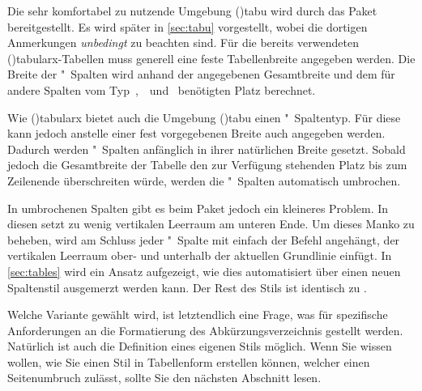 \documentclass[%
  english,ngerman,%
  cdgeometry=no,DIV=12,%
  cd=false,cdfont=false,cdtitle=true,%
  headings=normal,%
  automark,%
  listof=toc,%
]{tudscrartcl}
\begin{document}

Die sehr komfortabel zu nutzende Umgebung \Environment(){tabu} 
wird durch das Paket  bereitgestellt. Es wird später in 
\autoref{sec:tabu} vorgestellt, wobei die dortigen Anmerkungen \emph{unbedingt} 
zu beachten sind. Für die bereits verwendeten 
\Environment(){tabularx}-Tabellen muss generell eine feste 
Tabellenbreite angegeben werden. Die Breite der "~Spalten wird anhand 
der angegebenen Gesamtbreite und dem für andere Spalten vom 
Typ~,~~und~ benötigten Platz berechnet. 

Wie \Environment(){tabularx} bietet auch die Umgebung 
\Environment(){tabu} einen "~Spaltentyp. Für diese kann 
jedoch anstelle einer fest vorgegebenen Breite auch  
angegeben werden. Dadurch werden "~Spalten anfänglich in ihrer 
natürlichen Breite gesetzt. Sobald jedoch die Gesamtbreite der Tabelle den zur 
Verfügung stehenden Platz bis zum Zeilenende überschreiten würde, werden die 
"~Spalten automatisch umbrochen. 

In umbrochenen Spalten gibt es beim Paket  jedoch ein kleineres 
Problem. In diesen setzt  zu wenig vertikalen Leerraum am unteren 
Ende. Um dieses Manko zu beheben, wird am Schluss jeder "~Spalte mit 
 einfach der Befehl  
angehängt, der vertikalen Leerraum ober- und unterhalb der aktuellen Grundlinie 
einfügt. In \autoref{sec:tables} wird ein Ansatz aufgezeigt, wie dies 
automatisiert über einen neuen Spaltenstil ausgemerzt werden kann. Der Rest des 
Stils ist identisch zu .
%
\CodeHook{\let\newglossarystyle\renewglossarystyle}
\begin{Preamble*}

\end{Preamble*}
\begin{Hint}
\printacronyms[style=acrotabu]
\end{Hint}
\begin{quoting}[rightmargin=0pt]
\glsdisablehyper
\InputCode
\end{quoting}
%
Welche Variante gewählt wird, ist letztendlich eine Frage, was für spezifische 
Anforderungen an die Formatierung des Abkürzungsverzeichnis gestellt werden. 
Natürlich ist auch die Definition eines eigenen Stils möglich. Wenn Sie wissen 
wollen, wie Sie einen Stil in Tabellenform erstellen können, welcher einen 
Seitenumbruch zulässt, sollte Sie den nächsten Abschnitt lesen.
\end{document}
